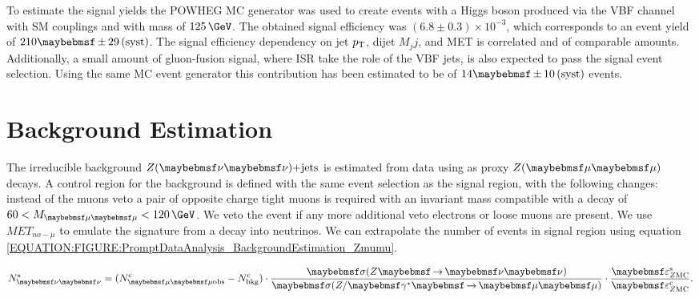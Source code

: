 To estimate the signal yields the \textsc{POWHEG} \gls{MC} generator was used to create events with a Higgs boson produced via the \gls{VBF} channel with \gls{SM} couplings and with mass of $125\,\GeV$. The obtained signal efficiency was $(6.8 \pm 0.3) \times 10^{-3}$, which corresponds to an event yield of $210 \pm 29\syst$. The signal efficiency dependency on jet $p_{\mathrm{T}}$, dijet $M_jj$, and \gls{MET} is correlated and of comparable amounts. Additionally, a small amount of gluon-fusion signal, where \gls{ISR} take the role of the \gls{VBF} jets, is also expected to pass the signal event selection. Using the same \gls{MC} event generator this contribution has been estimated to be of $14 \pm 10\syst$ events.

\section{Background Estimation}
\label{SECTION:PromptDataAnalysis_BackgroundEstimation}


The irreducible background $\Z(\nu \nu)\text{+jets}$ is estimated from data using as proxy $\Z (\mu \mu)$ decays. A control region for the \Z background is defined with the same event selection as the signal region, with the following changes: instead of the muons veto a pair of opposite charge tight muons is required with an invariant mass compatible with a \Z decay of $60 < M_{\mu\mu}<120\,\GeV$. We veto the event if any more additional veto electrons or loose muons are present. We use $MET_{no-\mu}$ to emulate the signature from a \Z decay into neutrinos. We can extrapolate the number of events in signal region using equation \ref{EQUATION:FIGURE:PromptDataAnalysis_BackgroundEstimation_Zmumu}.

\begin{equation}
N^\mathrm{s}_{\nu\nu} = (N^\mathrm{c}_{\mu\mu\text{obs}} - N^\mathrm{c}_\text{bkg}) \cdot \frac{\sigma(\Z \to \nu\nu)}{\sigma(\Z/\gamma^{*} \to \mu\mu)} \cdot \frac{\varepsilon^\mathrm{s}_{\Z \mathrm{MC}}}{\varepsilon^\mathrm{c}_{\Z \mathrm{MC}}}.
\label{EQUATION:FIGURE:PromptDataAnalysis_BackgroundEstimation_Zmumu}
\end{equation}


